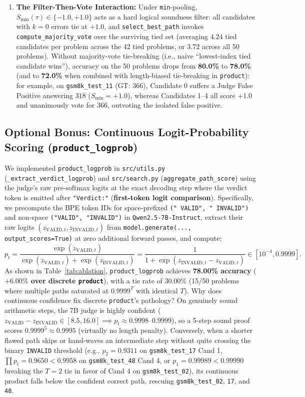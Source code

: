\documentclass[10pt,a4paper]{article}
\begin{document}
\begin{enumerate}
    \item \textbf{The Filter-Then-Vote Interaction:}
    Under \texttt{min}-pooling, $S_{\text{min}}(\tau) \in \{-1.0, +1.0\}$ acts as a hard logical soundness filter: all candidates with $k=0$ errors tie at $+1.0$, and \texttt{select\_best\_path} invokes \texttt{compute\_majority\_vote} over the surviving tied set (averaging $4.24$ tied candidates per problem across the 42 tied problems, or $3.72$ across all 50 problems). Without majority-vote tie-breaking (i.e., naive ``lowest-index tied candidate wins''), accuracy on the 50 problems drops from \textbf{80.0\%} to \textbf{78.0\%} (and to \textbf{72.0\%} when combined with length-biased tie-breaking in \texttt{product}): for example, on \texttt{gsm8k\_test\_11} (GT: $366$), Candidate 0 suffers a Judge False Positive answering $318$ ($S_{\text{min}} = +1.0$), whereas Candidates 1--4 all score $+1.0$ and unanimously vote for $366$, outvoting the isolated false positive.
\end{enumerate}

\subsection{Optional Bonus: Continuous Logit-Probability Scoring (\texttt{product\_logprob})}
We implemented \texttt{product\_logprob} in \texttt{src/utils.py} (\texttt{\_extract\_verdict\_logprob}) and \texttt{src/search.py} (\texttt{aggregate\_path\_score}) using the judge's raw pre-softmax logits at the exact decoding step where the verdict token is emitted after \texttt{"Verdict:"} (\textbf{first-token logit comparison}). Specifically, we precompute the BPE token IDs for space-prefixed \texttt{(" VALID", " INVALID")} and non-space \texttt{("VALID", "INVALID")} in \texttt{Qwen2.5-7B-Instruct}, extract their raw logits $(z_{\text{VALID},t}, z_{\text{INVALID},t})$ from \texttt{model.generate(..., output\_scores=True)} at zero additional forward passes, and compute:
\[
    p_t = \frac{\exp(z_{\text{VALID},t})}{\exp(z_{\text{VALID},t}) + \exp(z_{\text{INVALID},t})} = \frac{1}{1 + \exp(z_{\text{INVALID},t} - z_{\text{VALID},t})} \in [10^{-4}, 0.9999].
\]
As shown in Table~\ref{tab:ablation}, \texttt{product\_logprob} achieves \textbf{78.00\% accuracy} (\textbf{$+6.00\%$ over discrete \texttt{product}}), with a tie rate of $30.00\%$ (15/50 problems where multiple paths saturated at $0.9999^T$ with identical $T$). Why does continuous confidence fix discrete \texttt{product}'s pathology? On genuinely sound arithmetic steps, the 7B judge is highly confident ($z_{\text{VALID}} - z_{\text{INVALID}} \in [8.5, 16.0] \implies p_t \approx 0.9998$--$0.9999$), so a 5-step sound proof scores $0.9999^5 \approx 0.9995$ (virtually no length penalty). Conversely, when a shorter flawed path skips or hand-waves an intermediate step without quite crossing the binary \texttt{INVALID} threshold (e.g., $p_2 = 0.9311$ on \texttt{gsm8k\_test\_17} Cand 1, $\prod p_t = 0.9650 < 0.9958$ on \texttt{gsm8k\_test\_48} Cand 4, or $p_1 = 0.99989 < 0.99990$ breaking the $T=2$ tie in favor of Cand 4 on \texttt{gsm8k\_test\_02}), its continuous product falls below the confident correct path, rescuing \texttt{gsm8k\_test\_02}, \texttt{17}, and \texttt{48}.
\end{document}

